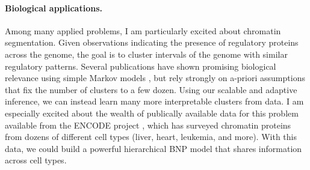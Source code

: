\documentclass[11pt,letterpaper,sans]{article}
\begin{document}
\paragraph{Biological applications.}
Among many applied problems, I am particularly excited about chromatin segmentation. Given observations indicating the presence of regulatory proteins across the genome, the goal is to cluster intervals of the genome with similar regulatory patterns. Several publications have shown promising biological relevance using simple Markov models \cite{ernst2010discovery,ernst2012chromhmm}, but rely strongly on a-priori assumptions that fix the number of clusters to a few dozen. Using our scalable and adaptive inference, we can instead learn many more interpretable clusters from data. 
I am especially excited about the wealth of publically available data for this problem available from the ENCODE project \cite{hoffman2012integrative}, which has surveyed chromatin proteins from dozens of different cell types (liver, heart, leukemia, and more). With this data, we could build a powerful hierarchical BNP model that shares information across cell types.



\end{document}
